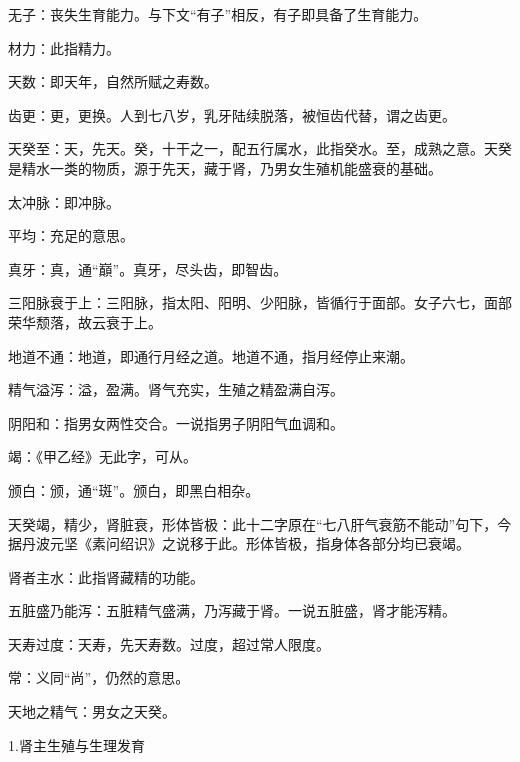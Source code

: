 \documentclass[draft,12pt]{ctexbook}
\begin{document}

\begin{jiaozhu}
	\item 无子：丧失生育能力。与下文“有子”相反，有子即具备了生育能力。
	\item 材力：此指精力。
	\item 天数：即天年，自然所赋之寿数。
	\item 齿更：更，更换。人到七八岁，乳牙陆续脱落，被恒齿代替，谓之齿更。
	\item 天癸至：天，先天。癸，十干之一，配五行属水，此指癸水。至，成熟之意。天癸是精水一类的物质，源于先天，藏于肾，乃男女生殖机能盛衰的基础。
	\item 太冲脉：即冲脉。
	\item 平均：充足的意思。
	\item 真牙：真，通“巔”。真牙，尽头齿，即智齿。
	\item 三阳脉衰于上：三阳脉，指太阳、阳明、少阳脉，皆循行于面部。女子六七，面部荣华颓落，故云衰于上。
	\item 地道不通：地道，即通行月经之道。地道不通，指月经停止来潮。
	\item 精气溢泻：溢，盈满。肾气充实，生殖之精盈满自泻。
	\item 阴阳和：指男女两性交合。一说指男子阴阳气血调和。
	\item 竭：《甲乙经》无此字，可从。
	\item 颁白：颁，通“斑”。颁白，即黑白相杂。
	\item 天癸竭，精少，肾脏衰，形体皆极：此十二字原在“七八肝气衰筋不能动”句下，今据丹波元坚《素问绍识》之说移于此。形体皆极，指身体各部分均已衰竭。
	\item 肾者主水：此指肾藏精的功能。
	\item 五脏盛乃能泻：五脏精气盛满，乃泻藏于肾。一说五脏盛，肾才能泻精。
	\item 天寿过度：天寿，先天寿数。过度，超过常人限度。
	\item 常：义同“尚”，仍然的意思。
	\item 天地之精气：男女之天癸。
\end{jiaozhu}


1.肾主生殖与生理发育
\end{document}
